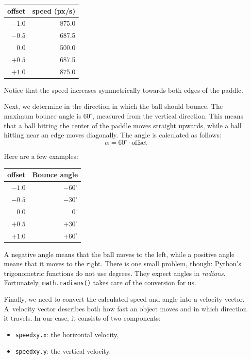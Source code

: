 \begin{center}
	\begin{tabular}{rr}
		\toprule
		offset & speed (px/s) \\
		\midrule
		$-1.0$ & 875.0 \\
		$-0.5$ & 687.5 \\
		$0.0$  & 500.0 \\
		$+0.5$ & 687.5 \\
		$+1.0$ & 875.0 \\
		\bottomrule
	\end{tabular}
\end{center}

Notice that the speed increases symmetrically towards both edges of the paddle.


Next, we determine in  the direction in which the ball should bounce. The maximum bounce angle is $60^\circ$, measured from the vertical direction. This means that a ball hitting the center of the paddle moves straight upwards, while a ball hitting near an edge moves diagonally. The angle is calculated as follows:
\[
	\alpha = 60^\circ \cdot \text{offset}
\]

Here are a few examples:
\begin{center}
	\begin{tabular}{rr}
		\toprule
		offset & Bounce angle \\
		\midrule
		$-1.0$ & $-60^\circ$ \\
		$-0.5$ & $-30^\circ$ \\
		$0.0$  & $0^\circ$ \\
		$+0.5$ & $+30^\circ$ \\
		$+1.0$ & $+60^\circ$ \\
		\bottomrule
	\end{tabular}
\end{center}

A negative angle means that the ball moves to the left, while a positive angle means that it moves to the right. There is one small problem, though: Python's trigonometric functions do not use degrees. They expect angles in \emph{radians}. Fortunately, \texttt{math.radians()} takes care of the conversion for us.

Finally, we need to convert the calculated speed and angle into a velocity vector. A~velocity vector describes both how fast an object moves and in which direction it travels. In our case, it consists of two components:

\begin{itemize}
	\item \texttt{speedxy.x}: the horizontal velocity,
	\item \texttt{speedxy.y}: the vertical velocity.
\end{itemize}

